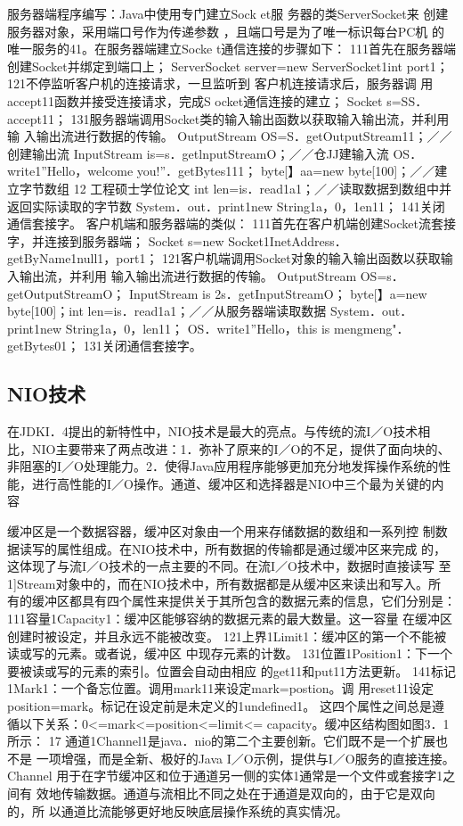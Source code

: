 服务器端程序编写：Java中使用专门建立Sock
et服
务器的类ServerSocket来
创建服务器对象，采用端口号作为传递参数
，且端口号是为了唯一标识每台PC机
的唯一服务的41。在服务器端建立Socke
t通信连接的步骤如下：
111首先在服务器端创建Socket并绑定到端口上；
ServerSocket server=new ServerSocket1int port1；
121不停监听客户机的连接请求，一旦监听到
客户机连接请求后，服务器调
用accept11函数并接受连接请求，完成S
ocket通信连接的建立；
Socket
s=SS．accept11；
131服务器端调用Socket类的输入输出函数以获取输入输出流，并利用输
入输出流进行数据的传输。
OutputStream OS=S．getOutputStream11；／／创建输出流
InputStream is=s．getlnputStreamO；／／仓JJ建输入流
OS．write1”Hello，welcome you!”．getBytes111；
byte[】aa=new byte[100]；／／建立字节数组
12
工程硕士学位论文
int len=is．read1a1；／／读取数据到数组中并返回实际读取的字节数
System．out．print1new String1a，0，1en11；
141关闭通信套接字。
客户机端和服务器端的类似：
111首先在客户机端创建Socket流套接字，并连接到服务器端；
Socket s=new
Socket1InetAddress．getByName1null1，port1；
121客户机端调用Socket对象的输入输出函数以获取输入输出流，并利用
输入输出流进行数据的传输。
OutputStream OS=s．getOutputStreamO；
InputStream
is 2s．getInputStreamO；
byte[】a=new byte[100]；int len=is．read1a1；／／从服务器端读取数据
System．out．print1new String1a，0，len11；
OS．write1”Hello，this
is
mengmeng"．getBytes01；
131关闭通信套接字。
\subsection{NIO技术}
在JDKI．4提出的新特性中，NIO技术是最大的亮点。与传统的流I／O技术相
比，NIO主要带来了两点改进：1．弥补了原来的I／O的不足，提供了面向块的、
非阻塞的I／O处理能力。2．使得Java应用程序能够更加充分地发挥操作系统的性
能，进行高性能的I／O操作。通道、缓冲区和选择器是NIO中三个最为关键的内
容

缓冲区是一个数据容器，缓冲区对象由一个用来存储数据的数组和一系列控
制数据读写的属性组成。在NIO技术中，所有数据的传输都是通过缓冲区来完成
的，这体现了与流I／O技术的一点主要的不同。在流I／O技术中，数据时直接读写
至1]Stream对象中的，而在NIO技术中，所有数据都是从缓冲区来读出和写入。所
有的缓冲区都具有四个属性来提供关于其所包含的数据元素的信息，它们分别是：
111容量1Capacity1：缓冲区能够容纳的数据元素的最大数量。这一容量
在缓冲区创建时被设定，并且永远不能被改变。
121上界1Limit1：缓冲区的第一个不能被读或写的元素。或者说，缓冲区
中现存元素的计数。
131位置1Position1：下一个要被读或写的元素的索引。位置会自动由相应
的get11和put11方法更新。
141标记1Mark1：一个备忘位置。调用mark11来设定mark=postion。调
用reset11设定position=mark。标记在设定前是未定义的1undefined1。
这四个属性之间总是遵循以下关系：0<=mark<=position<=limit<=
capacity。缓冲区结构图如图3．1所示：
17
通道1Channel1是java．nio的第二个主要创新。它们既不是一个扩展也不是
一项增强，而是全新、极好的Java I／O示例，提供与I／O服务的直接连接。Channel
用于在字节缓冲区和位于通道另一侧的实体1通常是一个文件或套接字1之间有
效地传输数据。通道与流相比不同之处在于通道是双向的，由于它是双向的，所
以通道比流能够更好地反映底层操作系统的真实情况。

